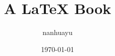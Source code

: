 \documentclass[11pt,UTF8]{ctexbook}
\begin{document}
\title{A LaTeX Book}
\author{nanhuayu}
\date{\today}
\maketitle



\end{document}
